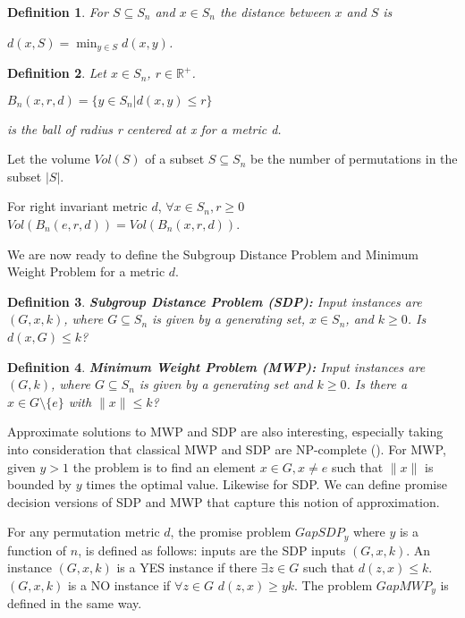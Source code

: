 \documentclass[12pt]{report}
\newcommand{\re}{\mathbb{R}}
\newtheorem{definition}{Definition}[section]
\begin{document}
\begin{definition}
	For $S \subseteq S_n$ and $x \in S_n$ the distance between $x$ and $S$ is
	
	\begin{center}
		$d(x, S) = \min_{y \in S} d(x, y)$.
	\end{center}
\end{definition}

\begin{definition}
	Let $x \in S_n$, $r \in \re^+$.
	
	\begin{center}
		$B_n(x, r, d) = \{y \in S_n | d(x, y) \leq r\}$
	\end{center}
	
	is the ball of radius r centered at x for a metric d.
\end{definition}

Let the volume $Vol(S)$ of a subset $S \subseteq S_n$ be the number of permutations in the subset $|S|$.

For right invariant metric $d$, $\forall x \in S_n, r \geq 0$ $Vol(B_n(e, r, d)) = Vol(B_n(x, r, d))$.

We are now ready to define the Subgroup Distance Problem and Minimum Weight Problem for a metric $d$.

\begin{definition}
	\textbf{Subgroup Distance Problem (SDP):} Input instances are $(G, x, k)$, where $G \subseteq S_n$ is given by a generating set, $x \in S_n$, and $k \geq 0$. Is $d(x, G) \leq k$?
\end{definition}

\begin{definition}
	\textbf{Minimum Weight Problem (MWP):} Input instances are $(G, k)$, where $G \subseteq S_n$ is given by a generating set and $k \geq 0$. Is there a $x \in G \setminus \{e\}$ with $\|x\| \leq k$?
\end{definition}

Approximate solutions to MWP and SDP are also interesting, especially taking into consideration that classical MWP and SDP are NP-complete (\cite{Thaynara}). For MWP, given $y > 1$ the problem is to find an element $x \in G, x \neq e$ such that $\|x\|$ is bounded by $y$ times the optimal value. Likewise for SDP. We can define promise decision versions of SDP and MWP that capture this notion of approximation.

For any permutation metric $d$, the promise problem $GapSDP_y$ where $y$ is a function of $n$, is defined as follows: inputs are the SDP inputs $(G, x, k)$. An instance $(G, x, k)$ is a YES instance if there $\exists z \in G$ such that $d(z, x) \leq k$. $(G, x, k)$ is a NO instance if $\forall z \in G$ $d(z, x) \ge yk$. The problem $GapMWP_y$ is defined in the same way.
\end{document}
